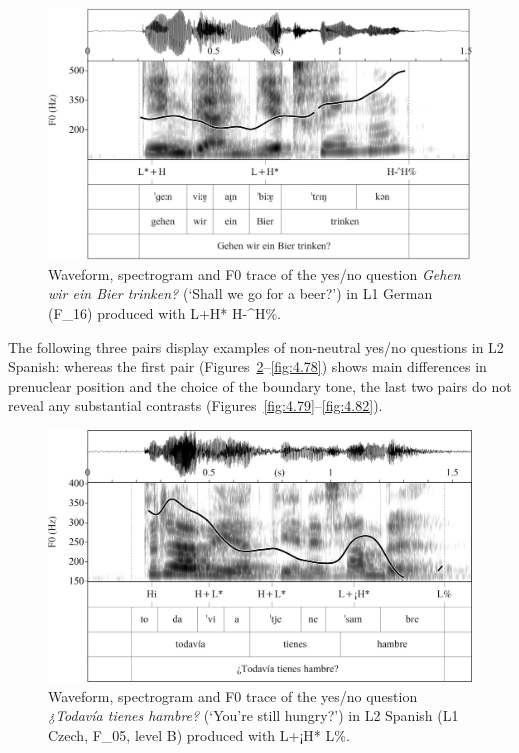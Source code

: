 \begin{figure}


\includegraphics[width=\textwidth]{figures/Figure_4.76.png}


\caption{Waveform, spectrogram and F0 trace of the yes/no question \textit{Gehen wir ein Bier trinken?} (‘Shall we go for a beer?’) in L1 German (F\_16) produced with L+H* H-\^{}H\%.}
\label{fig:4.76}
\end{figure}

The following three pairs display examples of non-neutral yes/no questions in L2 Spanish: whereas the first pair (Figures~\ref{fig:4.77}--\ref{fig:4.78}) shows main differences in prenuclear position and the choice of the boundary tone, the last two pairs do not reveal any substantial contrasts (Figures~\ref{fig:4.79}--\ref{fig:4.82}).

\begin{figure}


\includegraphics[width=\textwidth]{figures/Figure_4.77.png}



\caption{Waveform, spectrogram and F0 trace of the yes/no question \textit{¿Todavía tienes hambre?} (‘You’re still hungry?’) in L2 Spanish (L1 Czech, F\_05, level B) produced with L+¡H* L\%.}
\label{fig:4.77}
\end{figure}

